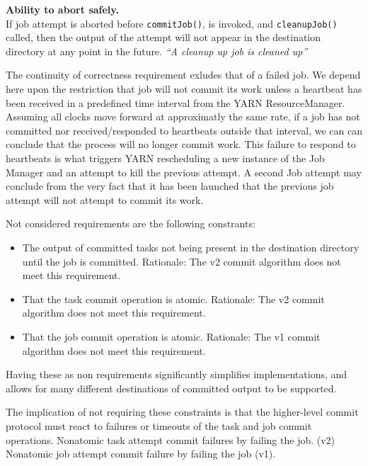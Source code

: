 \documentclass[conference]{IEEEtran}
\begin{document}
\begin{paragraph}
  \textbf{Ability to abort safely.}\\
  If job attempt is aborted before \texttt{commitJob()}, is invoked, and
  \texttt{cleanupJob()} called, then the output of the attempt will not appear in the
  destination directory at any point in the future.
  \emph{``A cleanup up job is cleaned up''}
\end{paragraph}


The continuity of correctness requirement exludes that of a failed job.
We depend here upon the restriction that job will not commit its work unless
a heartbeat has been received in a predefined time interval from the YARN ResourceManager.
Assuming all clocks move forward at approximatly the same rate, if a job has
not committed nor received/responded to heartbeats outside that interval,
we can can conclude that the process will no longer commit work.
This failure to respond to heartbeats is what triggers YARN rescheduling a new
instance of the Job Manager and an attempt to kill the previous attempt.
A second Job attempt may conclude from the very fact that it has been launched
that the previous job attempt will not attempt to commit its work.


Not considered requirements are the following constrants:

\begin{itemize}
  \item The output of committed tasks not being present in the destination directory
  until the job is committed.
  Rationale: The v2 commit algorithm does not meet this requirement.

  \item That the task commit operation is atomic.
  Rationale: The v2 commit algorithm does not meet this requirement.

  \item That the job commit operation is atomic.
  Rationale: The v1 commit algorithm does not meet this requirement.

\end{itemize}

Having these as non requirements significantly simplifies implementations,
and allows for many different destinations of committed output to be supported.

The implication of not requiring these constraints is that the higher-level
commit protocol must react to failures or timeouts of the task and job
commit operations.
Nonatomic task attempt commit failures by failing the job. (v2)
Nonatomic job attempt commit failure by failing the job (v1).
\end{document}
